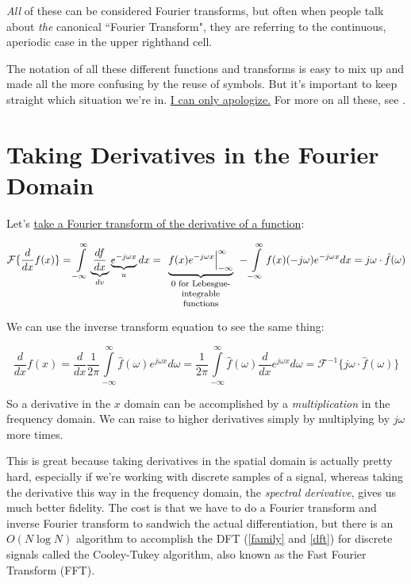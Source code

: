 \documentclass[10pt]{article}
\begin{document}
\textit{All} of these can be considered Fourier transforms, but often when people talk about \textit{the} canonical ``Fourier Transform", they are referring to the continuous, aperiodic case in the upper righthand cell.

The notation of all these different functions and transforms is easy to mix up and made all the more confusing by the reuse of symbols. But it's important to keep straight which situation we're in. \href{https://www.youtube.com/watch?v=6ITWKtTYlEI&t=69s}{I can only apologize.} For more on all these, see \cite{oppenheim}.

\section{Taking Derivatives in the Fourier Domain}\label{derivative}

Let's \href{https://www.youtube.com/watch?v=d5d0ORQHNYs}{take a Fourier transform of the derivative of a function}\cite{brunton}:

$$\mathcal{F}\{\frac{d}{dx} f(x)\} = \int\limits_{-\infty}^{\infty} \underbrace{\frac{df}{dx}}_{dv} \underbrace{e^{-j \omega x}}_{u} dx = \underbrace{f(x) e^{-j \omega x} \Big|_{-\infty}^{\infty}}_{\parbox{25mm}{\footnotesize \centering 0 for Lebesgue-integrable functions}} - \int\limits_{-\infty}^{\infty} f(x) (-j \omega) e^{-j \omega x} dx = j \omega \cdot \hat{f}(\omega)$$

We can use the inverse transform equation to see the same thing:

$$\frac{d}{dx} f(x) = \frac{d}{dx} \frac{1}{2\pi} \int\limits_{-\infty}^{\infty} \hat{f}(\omega) e^{j \omega x} d \omega = \frac{1}{2\pi} \int\limits_{-\infty}^{\infty} \hat{f}(\omega) \frac{d}{dx} e^{j \omega x} d \omega = \mathcal{F}^{-1}\{j \omega \cdot \hat{f}(\omega)\}$$

So a derivative in the $x$ domain can be accomplished by a \textit{multiplication} in the frequency domain. We can raise to higher derivatives simply by multiplying by $j \omega$ more times.

This is great because taking derivatives in the spatial domain is actually pretty hard, especially if we're working with discrete samples of a signal, whereas taking the derivative this way in the frequency domain, the \textit{spectral derivative}, gives us much better fidelity.\cite{trefethen4}\cite{kutz} The cost is that we have to do a Fourier transform and inverse Fourier transform to sandwich the actual differentiation, but there is an $O(N \log N)$ algorithm to accomplish the DFT (\autoref{family} and \autoref{dft}) for discrete signals called the Cooley-Tukey algorithm, also known as the Fast Fourier Transform (FFT)\cite{kutz}.
\end{document}
